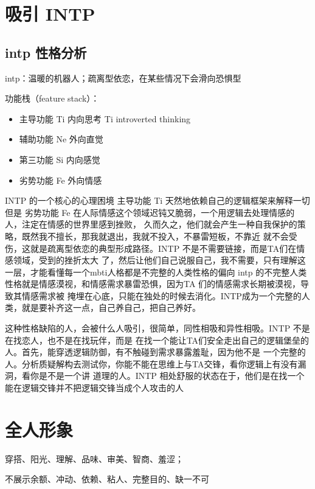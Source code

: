 \documentclass{book}
\begin{document}
\section{吸引 INTP}

\subsection{intp 性格分析}

intp：温暖的机器人；疏离型依恋，在某些情况下会滑向恐惧型

功能栈（feature stack）：

\begin{itemize}
    \item 主导功能 Ti 内向思考 Ti introverted thinking
    \item 辅助功能 Ne 外向直觉
    \item 第三功能 Si 内向感觉
    \item 劣势功能 Fe 外向情感
\end{itemize}

INTP 的一个核心的心理困境
主导功能 Ti 天然地依赖自己的逻辑框架来解释一切
但是 劣势功能 Fe 在人际情感这个领域迟钝又脆弱，一个用逻辑去处理情感的人，注定在情感的世界里感到挫败，
久而久之，他们就会产生一种自我保护的策略，既然我不擅长，那我就退出，我就不投入，不暴雷短板，不靠近
就不会受伤，这就是疏离型依恋的典型形成路径。INTP 不是不需要链接，而是TA们在情感领域，受到的挫折太大
了，然后让他们自己说服自己，我不需要，只有理解这一层，才能看懂每一个mbti人格都是不完整的人类性格的偏向
intp 的不完整人类性格就是情感漠视，和情感需求暴雷恐惧，因为TA 们的情感需求长期被漠视，导致其情感需求被
掩埋在心底，只能在独处的时候去消化。INTP成为一个完整的人类，就是要补齐这一点，自己养自己，把自己养好。

这种性格缺陷的人，会被什么人吸引，很简单，同性相吸和异性相吸。INTP 不是在找恋人，也不是在找玩伴，而是
在找一个能让TA们安全走出自己的逻辑堡垒的人。首先，能穿透逻辑防御，有不触碰到需求暴露羞耻，因为他不是
一个完整的人。分析质疑解构去测试你，你能不能在思维上与TA交锋，看你逻辑上有没有漏洞，看你是不是一个讲
道理的人。INTP 相处舒服的状态在于，他们是在找一个能在逻辑交锋并不把逻辑交锋当成个人攻击的人

\section{全人形象}

穿搭、阳光、理解、品味、审美、智商、羞涩；

不展示余额、冲动、依赖、粘人、完整目的、缺一不可
\end{document}
